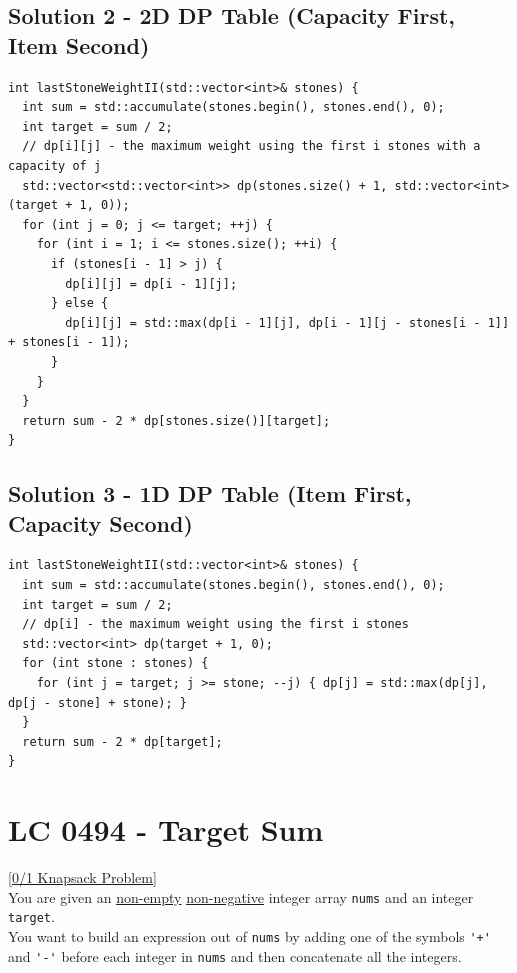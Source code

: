 \subsection*{Solution 2 - 2D DP Table (Capacity First, Item Second)}
\begin{lstlisting}
int lastStoneWeightII(std::vector<int>& stones) {
  int sum = std::accumulate(stones.begin(), stones.end(), 0);
  int target = sum / 2;
  // dp[i][j] - the maximum weight using the first i stones with a capacity of j
  std::vector<std::vector<int>> dp(stones.size() + 1, std::vector<int>(target + 1, 0));
  for (int j = 0; j <= target; ++j) {
    for (int i = 1; i <= stones.size(); ++i) {
      if (stones[i - 1] > j) {
        dp[i][j] = dp[i - 1][j];
      } else {
        dp[i][j] = std::max(dp[i - 1][j], dp[i - 1][j - stones[i - 1]] + stones[i - 1]);
      }
    }
  }
  return sum - 2 * dp[stones.size()][target];
}
\end{lstlisting}

\subsection*{Solution 3 - 1D DP Table (Item First, Capacity Second)}
\begin{lstlisting}
int lastStoneWeightII(std::vector<int>& stones) {
  int sum = std::accumulate(stones.begin(), stones.end(), 0);
  int target = sum / 2;
  // dp[i] - the maximum weight using the first i stones
  std::vector<int> dp(target + 1, 0);
  for (int stone : stones) {
    for (int j = target; j >= stone; --j) { dp[j] = std::max(dp[j], dp[j - stone] + stone); }
  }
  return sum - 2 * dp[target];
}
\end{lstlisting}

\section{LC 0494 - Target Sum}\label{lc0494}
{\hyperref[subsubsec:01_knapsack_oj_problems]{[0/1 Knapsack Problem]}} \\

You are given an \ul{non-empty} \ul{non-negative} integer array {\colorbox{CodeBackground}{\lstinline|nums|}} and an integer {\colorbox{CodeBackground}{\lstinline|target|}}.\\

You want to build an expression out of {\colorbox{CodeBackground}{\lstinline|nums|}} by adding one of the symbols {\colorbox{CodeBackground}{\lstinline|'+'|}} and {\colorbox{CodeBackground}{\lstinline|'-'|}} before each integer in {\colorbox{CodeBackground}{\lstinline|nums|}} and then concatenate all the integers.\\

